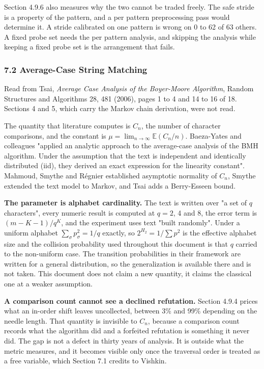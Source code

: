 Section 4.9.6 also measures why the two cannot be traded freely. The safe stride is a property of the pattern, and a per pattern preprocessing pass would determine it. A stride calibrated on one pattern is wrong on 0 to 62 of 63 others. A fixed probe set needs the per pattern analysis, and skipping the analysis while keeping a fixed probe set is the arrangement that fails.

\subsubsection{7.2 Average-Case String Matching}

Read from Tsai, \emph{Average Case Analysis of the Boyer-Moore Algorithm}, Random Structures and Algorithms 28, 481 (2006), pages 1 to 4 and 14 to 16 of 18. Sections 4 and 5, which carry the Markov chain derivation, were not read.

The quantity that literature computes is \(C_n\), the number of character comparisons, and the constant is \(\mu = \lim_{n\to\infty} \mathbb{E}(C_n/n)\). Baeza-Yates and colleagues "applied an analytic approach to the average-case analysis of the BMH algorithm. Under the assumption that the text is independent and identically distributed (iid), they derived an exact expression for the linearity constant". Mahmoud, Smythe and Régnier established asymptotic normality of \(C_n\), Smythe extended the text model to Markov, and Tsai adds a Berry-Esseen bound.

\noindent\textbf{The parameter is alphabet cardinality.} The text is written over "a set of \(q\) characters", every numeric result is computed at \(q = 2\), 4 and 8, the error term is \((m-K-1)/q^K\), and the experiment uses text "built randomly". Under a uniform alphabet \(\sum_\sigma p_\sigma^2 = 1/q\) exactly, so \(2^{H_2} = 1/\sum p^2\) is the effective alphabet size and the collision probability used throughout this document is that \(q\) carried to the non-uniform case. The transition probabilities in their framework are written for a general distribution, so the generalization is available there and is not taken. This document does not claim a new quantity, it claims the classical one at a weaker assumption.

\noindent\textbf{A comparison count cannot see a declined refutation.} Section 4.9.4 prices what an in-order shift leaves uncollected, between 3\% and 99\% depending on the needle length. That quantity is invisible to \(C_n\), because a comparison count records what the algorithm did and a forfeited refutation is something it never did. The gap is not a defect in thirty years of analysis. It is outside what the metric measures, and it becomes visible only once the traversal order is treated as a free variable, which Section 7.1 credits to Vishkin.

